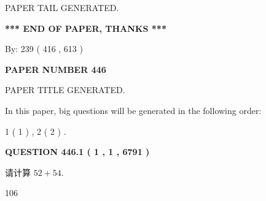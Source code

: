 \documentclass{ctexart}
\begin{document}
   
   
   
   
   
 \vspace{0.2in}
 
   
   
\vspace{2.0in} PAPER TAIL GENERATED.
   
   
   
   
\vspace{1.0in} 
{\textbf{\large{ *** END OF PAPER, THANKS *** }}} 
   
   
\hspace{1.0in} By: 
 239 ( 416 ,  613 )
   
   
   
   
\newpage 
\setcounter{page}{ 
   446001 } 
   
   
   
   
 {\textbf{ \Large{ PAPER NUMBER  446  }}}
   
   
\vspace{0.2in}
   
   
   
   
   
   
   
   
 \vspace{0.2in}
 
 
 
 
   
   
 PAPER TITLE GENERATED.
   
   
   
\vspace{0.2in}
   
In this paper, big questions will be generated in the following order: 
   
   
   1 ( 1 )
 ,
   2 ( 2 )
 .
  
\vspace{0.2in}
  
{\textbf{\Large{QUESTION
446.1 
 ( 1 , 1 , 6791 )
}}}
  
  
 
请计算 $ %
52 +  %
54 $.
 
 
 
\noindent{}
 
 

106
 
 
\noindent{}
 
\end{document}
